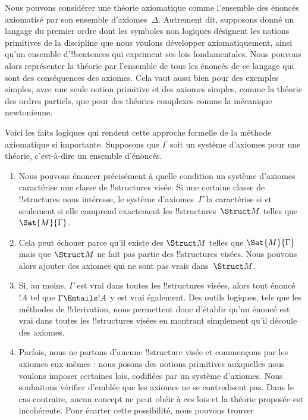 \documentclass[../../../include/open-logic-section]{subfiles}
\begin{document}
\begin{explain}
Nous pouvons considérer une théorie axiomatique comme l'ensemble des
énoncés axiomatisé par son ensemble d'axiomes~$\Delta$. Autrement
dit, supposons donné un langage du premier ordre dont les symboles
non logiques désignent les notions primitives de la discipline que
nous voulons développer axiomatiquement, ainsi qu'un ensemble
d'!!{sentence}s qui expriment ses lois fondamentales. Nous pouvons
alors représenter la théorie par l'ensemble de tous les énoncés de
ce langage qui sont des conséquences des axiomes. Cela vaut aussi
bien pour des exemples simples, avec une seule notion primitive et
des axiomes simples, comme la théorie des ordres partiels, que pour
des théories complexes comme la mécanique newtonienne.

Voici les faits logiques qui rendent cette approche formelle de la
méthode axiomatique si importante. Supposons que $\Gamma$ soit un
système d'axiomes pour une théorie, c'est-à-dire un ensemble
d'énoncés.
\begin{enumerate}
\item Nous pouvons énoncer précisément à quelle condition un système
  d'axiomes caractérise une classe de !!{structure}s visée. Si une
  certaine classe de !!{structure}s nous intéresse, le système
  d'axiomes~$\Gamma$ la caractérise si et seulement si elle comprend
  exactement les !!{structure}s~$\Struct M$ telles que
  $\Sat{M}{\Gamma}$.
\item Cela peut échouer parce qu'il existe des $\Struct M$ telles
  que $\Sat{M}{\Gamma}$ mais que $\Struct M$ ne fait pas partie des
  !!{structure}s visées. Nous pouvons alors ajouter des axiomes qui
  ne sont pas vrais dans~$\Struct M$.
\item Si, au moins, $\Gamma$ est vrai dans toutes les !!{structure}s
  visées, alors tout énoncé~$!A$ tel que $\Gamma \Entails !A$ y est
  vrai également. Des outils logiques, tels que les méthodes de
  !!{derivation}, nous permettent donc d'établir qu'un énoncé est
  vrai dans toutes les !!{structure}s visées en montrant simplement
  qu'il découle des axiomes.
\item Parfois, nous ne partons d'aucune !!{structure} visée et
  commençons par les axiomes eux-mêmes : nous posons des notions
  primitives auxquelles nous voulons imposer certaines lois, codifiées
  par un système d'axiomes. Nous souhaitons vérifier d'emblée que
  les axiomes ne se contredisent pas. Dans le cas contraire, aucun
  concept ne peut obéir à ces lois et la théorie proposée est
  incohérente. Pour écarter cette possibilité, nous pouvons trouver

\end{enumerate}
\end{explain}
\end{document}
